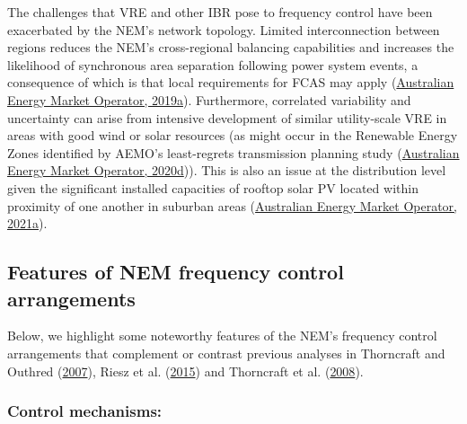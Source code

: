 \documentclass[12pt,a4paper,]{report}
\begin{document}
The challenges that VRE and other IBR pose to frequency control have
been exacerbated by the NEM's network topology. Limited interconnection
between regions reduces the NEM's cross-regional balancing capabilities
and increases the likelihood of synchronous area separation following
power system events, a consequence of which is that local requirements
for FCAS may apply
(\protect\hyperlink{ref-australianenergymarketoperatorMaintainingPowerSystem2019}{Australian
Energy Market Operator, 2019a}). Furthermore, correlated variability and
uncertainty can arise from intensive development of similar
utility-scale VRE in areas with good wind or solar resources (as might
occur in the Renewable Energy Zones identified by AEMO's least-regrets
transmission planning study
(\protect\hyperlink{ref-australianenergymarketoperator2020IntegratedSystem2020}{Australian
Energy Market Operator, 2020d})). This is also an issue at the
distribution level given the significant installed capacities of rooftop
solar PV located within proximity of one another in suburban areas
(\protect\hyperlink{ref-australianenergymarketoperatorEnduringPrimaryFrequency2021}{Australian
Energy Market Operator, 2021a}).

\hypertarget{features-of-nem-frequency-control-arrangements}{%
\subsection{Features of NEM frequency control
arrangements}\label{features-of-nem-frequency-control-arrangements}}

Below, we highlight some noteworthy features of the NEM's frequency
control arrangements that complement or contrast previous analyses in
Thorncraft and Outhred
(\protect\hyperlink{ref-thorncraftExperienceMarketbasedAncillary2007}{2007}),
Riesz et al.
(\protect\hyperlink{ref-rieszFrequencyControlAncillary2015}{2015}) and
Thorncraft et al.
(\protect\hyperlink{ref-thorncraftMarketbasedAncillaryServices2008}{2008}).

\hypertarget{control-mechanisms}{%
\subsubsection{Control mechanisms:}\label{control-mechanisms}}
\end{document}
